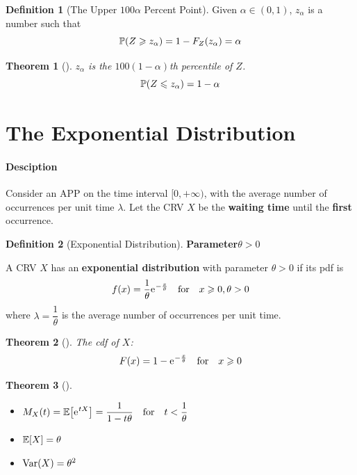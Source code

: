 \documentclass[10pt,UTF8]{article}
\newenvironment{definition box}
{\begin{tcolorbox}[colback=blue!5!white,colframe=blue!75!black,parbox=false,before upper=\par,before lower=\par]}
{\end{tcolorbox}}
\newenvironment{theorem box}
{\begin{tcolorbox}[colback=yellow!5!white,colframe=yellow!75!black,parbox=false,before upper=\par,before lower=\par]}
{\end{tcolorbox}}
\theoremstyle{definition}
\newtheorem{definition inner}{Definition}[section]
\newenvironment{definition}[1][]
{\begin{definition box}\begin{definition inner}[#1]\hfill\par}
{\end{definition inner}\end{definition box}}
\theoremstyle{plain}
\newtheorem{theorem inner}{Theorem}[section]
\newenvironment{theorem}[1][]
{\begin{theorem box}\begin{theorem inner}[#1]\hfill\par}
{\end{theorem inner}\end{theorem box}}
\theoremstyle{definition}
\newtheorem*{proof inner}{\textit{Proof}}
\theoremstyle{remark}
\newcommand{\e}{\mathrm{e}{\mkern 1 mu}}
\newcommand{\E}[1]{\mathbb{E}\qty[#1]}  %
\newcommand{\Prob}{\mathbb{P}\qty}
\newcommand{\Var}[1]{\mathrm{Var}\qty(#1)}  %
\begin{document}
\begin{definition}[The Upper $100\alpha$ Percent Point]
    Given $\alpha\in(0,1)$, $z_\alpha$ is a number such that
    \begin{equation*}
        \Prob(Z \geqslant z_\alpha) = 1-F_Z(z_\alpha) = \alpha
    \end{equation*}
\end{definition}

\begin{theorem}
    $z_\alpha$ is the $100(1-\alpha)$th percentile of $Z$.
    \begin{equation*}
        \Prob(Z \leqslant z_\alpha) = 1-\alpha
    \end{equation*}
\end{theorem}


\section{The Exponential Distribution}

\paragraph{Desciption}
Consider an APP on the time interval $[0,+\infty)$,
with the average number of occurrences per unit time $\lambda$.
Let the CRV $X$ be the \textbf{waiting time} until the \textbf{first} occurrence.

\begin{definition}[Exponential Distribution]
    \textbf{Parameter}\qquad $\theta>0$

    A CRV $X$ has an \textbf{exponential distribution}
    with parameter $\theta>0$
    if its pdf is
    \begin{equation*}
        f(x) = \frac{1}{\theta}\e^{-\frac{x}{\theta}}
        \qfor x\geqslant 0, \theta>0
    \end{equation*}
    where $\lambda = \dfrac{1}{\theta}$ is the average number of occurrences per unit time.
\end{definition}

\begin{theorem}
    The cdf of $X$:
    \begin{equation*}
        F(x) = 1 - \e^{-\frac{x}{\theta}} \qfor x\geqslant 0
    \end{equation*}
\end{theorem}

\begin{theorem}
    \begin{itemize}
        \item $\displaystyle M_X(t) = \E{\e^{tX}} = \frac{1}{1-t\theta}
         \qfor t<\frac{1}{\theta}$
        \item $\E{X} = \theta$
        \item $\Var{X} = \theta^2$
    \end{itemize}
\end{theorem}
\end{document}
